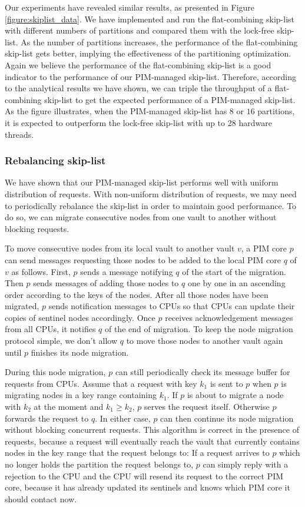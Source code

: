 Our experiments have revealed similar results, 
as presented in Figure \ref{figure:skiplist_data}.
We have implemented and run the flat-combining skip-list with different numbers of
partitions and compared them with the lock-free skip-list.
As the number of partitions increases, the performance of the flat-combining skip-list
gets better, implying the effectiveness of the partitioning optimization.
Again we believe the performance of the flat-combining skip-list is a good indicator
to the performance of our PIM-managed skip-list.
Therefore, according to the analytical results we have shown, we can triple the throughput
of a flat-combining skip-list to get the expected performance of a PIM-managed skip-list.
As the figure illustrates, when the PIM-managed skip-list has $8$ or $16$ partitions,
it is expected to outperform the lock-free skip-list with up to 28 hardware threads.


\subsubsection{Rebalancing skip-list}
We have shown that our PIM-managed skip-list performs well with uniform distribution of requests. 
With non-uniform distribution of requests, we may need to periodically rebalance the skip-list 
in order to maintain good performance. 
To do so, we can migrate consecutive nodes from one vault to another without blocking requests.  

To move consecutive nodes from its local vault to another vault $v$, a PIM core $p$ 
can send messages requesting those nodes to be added to the local PIM core $q$ of $v$ as follows. 
First, $p$ sends a message notifying $q$ of the start of the migration. 
Then $p$ sends messages of adding those nodes to $q$ one by one in an ascending order 
according to the keys of the nodes. 
After all those nodes have been migrated, $p$ sends notification messages to CPUs so that 
CPUs can update their copies of sentinel nodes accordingly.
Once $p$ receives acknowledgement messages from all CPUs, it notifies $q$ of the end of migration.
To keep the node migration protocol simple, we don't allow $q$ to move those nodes 
to another vault again until $p$ finishes its node migration. 

During this node migration, $p$ can still periodically check its message buffer for requests from CPUs.
Assume that a request with key $k_1$ is sent to $p$ when $p$ is migrating nodes 
in a key range containing $k_1$.  
If $p$ is about to migrate a node with $k_2$ at the moment and $k_1 \ge k_2$, 
$p$ serves the request itself. 
Otherwise $p$ forwards the request to $q$. 
In either case, $p$ can then continue its node migration without blocking concurrent requests. 
This algorithm is correct in the presence of requests, because 
a request will eventually reach the vault that 
currently contains nodes in the key range that the request belongs to: 
If a request arrives to $p$ which no longer holds the partition the request belongs to, 
$p$ can simply reply with a rejection to the CPU and the CPU will resend its request to 
the correct PIM core, 
because it has already updated its sentinels and knows which PIM core it should contact now. 

